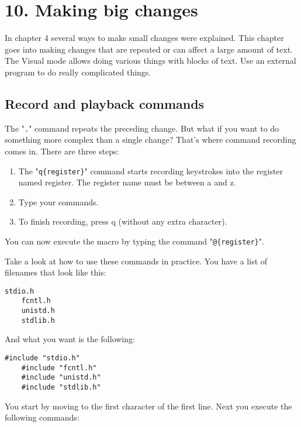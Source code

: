 \section{10. Making big changes}
In chapter 4 several ways to make small changes were explained.  This chapter
goes into making changes that are repeated or can affect a large amount of
text.  The Visual mode allows doing various things with blocks of text.  Use
an external program to do really complicated things.
\subsection{Record and playback commands}
The "\verb!.!" command repeats the preceding change.
But what if you want to do something more complex than a single change?  That's where command recording comes in.
There are three steps:

\begin{enumerate}
				\item The "\verb!q{register}!" command starts recording keystrokes into the register named {register}.
								The register name must be between a and z.
				\item Type your commands.
				\item To finish recording, press q (without any extra character).
\end{enumerate}

You can now execute the macro by typing the command "\verb!@{register}!".

Take a look at how to use these commands in practice.
You have a list of filenames that look like this:

\begin{Verbatim}[samepage=true]
    stdio.h 
    fcntl.h 
    unistd.h 
    stdlib.h 
\end{Verbatim}

And what you want is the following:

\begin{Verbatim}[samepage=true]
    #include "stdio.h" 
    #include "fcntl.h" 
    #include "unistd.h" 
    #include "stdlib.h" 
\end{Verbatim}

You start by moving to the first character of the first line.
Next you execute the following commands:

